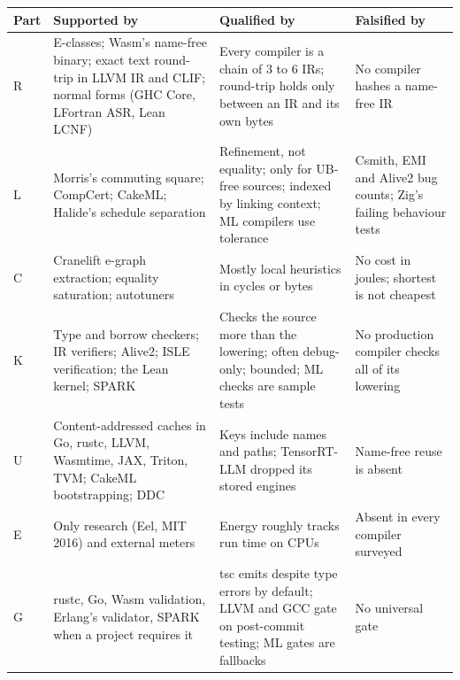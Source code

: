 \documentclass[10pt,letterpaper]{article}
\begin{document}
{\footnotesize\setlength{\tabcolsep}{3.8pt}\renewcommand{\arraystretch}{1.15}
\begin{longtable}[]{@{}
  >{\raggedright\arraybackslash}p{}
  >{\raggedright\arraybackslash}p{}
  >{\raggedright\arraybackslash}p{}
  >{\raggedright\arraybackslash}p{}@{}}
\toprule\noalign{}
\begin{minipage}[b]{\linewidth}\raggedright
\textbf{Part}
\end{minipage} & \begin{minipage}[b]{\linewidth}\raggedright
\textbf{Supported by}
\end{minipage} & \begin{minipage}[b]{\linewidth}\raggedright
\textbf{Qualified by}
\end{minipage} & \begin{minipage}[b]{\linewidth}\raggedright
\textbf{Falsified by}
\end{minipage} \\
\midrule\noalign{}
\endhead
\bottomrule\noalign{}
\endlastfoot
R & E-classes; Wasm's name-free binary; exact text round-trip in LLVM IR
and CLIF; normal forms (GHC Core, LFortran ASR, Lean LCNF) & Every
compiler is a chain of 3 to 6 IRs; round-trip holds only between an IR
and its own bytes & No compiler hashes a name-free IR \\
L & Morris's commuting square; CompCert; CakeML; Halide's schedule
separation & Refinement, not equality; only for UB-free sources; indexed
by linking context; ML compilers use tolerance & Csmith, EMI and Alive2
bug counts; Zig's failing behaviour tests \\
C & Cranelift e-graph extraction; equality saturation; autotuners &
Mostly local heuristics in cycles or bytes & No cost in joules; shortest
is not cheapest \\
K & Type and borrow checkers; IR verifiers; Alive2; ISLE verification;
the Lean kernel; SPARK & Checks the source more than the lowering; often
debug-only; bounded; ML checks are sample tests & No production compiler
checks all of its lowering \\
U & Content-addressed caches in Go, rustc, LLVM, Wasmtime, JAX, Triton,
TVM; CakeML bootstrapping; DDC & Keys include names and paths;
TensorRT-LLM dropped its stored engines & Name-free reuse is absent \\
E & Only research (Eel, MIT 2016) and external meters & Energy roughly
tracks run time on CPUs & Absent in every compiler surveyed \\
G & rustc, Go, Wasm validation, Erlang's validator, SPARK when a project
requires it & tsc emits despite type errors by default; LLVM and GCC
gate on post-commit testing; ML gates are fallbacks & No universal
gate \\
\end{longtable}
}
\end{document}
